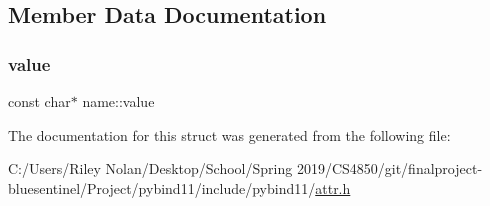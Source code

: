 \subsection{Member Data Documentation}
\mbox{\label{structname_a86a1d2e431af94bee2c79e1d102eb4c7}} 
\subsubsection{\texorpdfstring{value}{value}}
{\footnotesize\ttfamily const char$\ast$ name\+::value}



The documentation for this struct was generated from the following file\+:\begin{DoxyCompactItemize}
\item 
C\+:/\+Users/\+Riley Nolan/\+Desktop/\+School/\+Spring 2019/\+C\+S4850/git/finalproject-\/bluesentinel/\+Project/pybind11/include/pybind11/\mbox{\hyperlink{attr_8h}{attr.\+h}}\end{DoxyCompactItemize}
